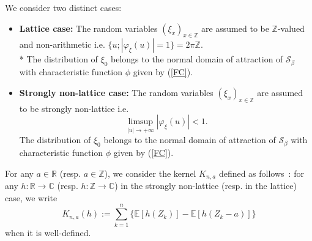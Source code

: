 \documentclass[oneside, a4paper,11pt,reqno]{amsart}
\begin{document}
We consider two distinct cases:
\begin{itemize}
\item{\bf Lattice case:} The random variables $(\xi_x)_{x\in {\mathbb{Z}}}$ are assumed to be $\mathbb Z$-valued and non-arithmetic i.e. 
$\{u; |\varphi_\xi(u)|=1\}=2\pi{\mathbb{Z}}$.\\*
\noindent The distribution of $\xi_0$ belongs to the normal 
domain of attraction of $\mathcal S_\beta$ with characteristic function $\phi$ given by
(\ref{FC}). 
\item{\bf Strongly non-lattice case:} The random variables $(\xi_x)_{x \in{\mathbb{Z}}}$ are assumed to be 
strongly non-lattice i.e.
$$\limsup_{|u|\rightarrow +\infty}|\varphi_\xi(u)|<1.$$
The distribution of $\xi_0$ belongs to the normal 
domain of attraction of $\mathcal S_\beta$ with characteristic function $\phi$ given by
(\ref{FC}). \end{itemize}
For any $a\in \mathbb{R}$ (resp. $a\in\mathbb Z$), we consider  the  kernel  
$K_{n,a} $ defined as follows~: for any $h : \mathbb{R}\to\mathbb{C}$ 
(resp. $h : \mathbb{Z}\to\mathbb{C}$) in the strongly non-lattice (resp. in the lattice) case, we write 
$$K_{n,a}(h) :=   \sum_{k=1}^n \Big\{ \mathbb{E}[h(Z_k)] -  {\mathbb E}[h(Z_k-a)]\Big\}$$ 
when it is well-defined.
\end{document}
